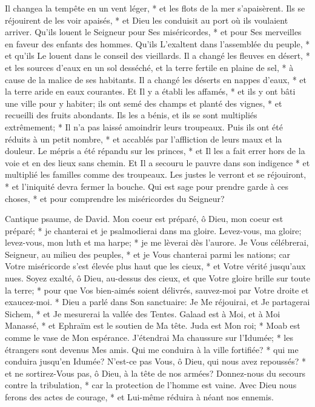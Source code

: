 Il changea la tempête en un vent léger, * et les flots de la mer s'apaisèrent.
Ils se réjouirent de les voir apaisés, * et Dieu les conduisit au port où ils voulaient arriver.
Qu'ils louent le Seigneur pour Ses miséricordes, * et pour Ses merveilles en faveur des enfants des hommes.
Qu'ils L'exaltent dans l'assemblée du peuple, * et qu'ils Le louent dans le conseil des vieillards.
Il a changé les fleuves en désert, * et les sources d'eaux en un sol desséché,
et la terre fertile en plaine de sel, * à cause de la malice de ses habitants.
Il a changé les déserts en nappes d'eaux, * et la terre aride en eaux courantes.
Et Il y a établi les affamés, * et ils y ont bâti une ville pour y habiter;
ils ont semé des champs et planté des vignes, * et recueilli des fruits abondants.
Ils les a bénis, et ils se sont multipliés extrêmement; * Il n'a pas laissé amoindrir leurs troupeaux.
Puis ils ont été réduits à un petit nombre, * et accablés par l'affliction de leurs maux et la douleur.
Le mépris a été répandu sur les princes, * et Il les a fait errer hors de la voie et en des lieux sans chemin.
Et Il a secouru le pauvre dans son indigence * et multiplié les familles comme des troupeaux.
Les justes le verront et se réjouiront, * et l'iniquité devra fermer la bouche.
Qui est sage pour prendre garde à ces choses, * et pour comprendre les miséricordes du Seigneur?

Cantique psaume, de David.
Mon coeur est préparé, ô Dieu, mon coeur est préparé; * je chanterai et je psalmodierai dans ma gloire.
Levez-vous, ma gloire; levez-vous, mon luth et ma harpe; * je me lèverai dès l'aurore.
Je Vous célébrerai, Seigneur, au milieu des peuples, * et je Vous chanterai parmi les nations;
car Votre miséricorde s'est élevée plus haut que les cieux, * et Votre vérité jusqu'aux nues.
Soyez exalté, ô Dieu, au-dessus des cieux, et que Votre gloire brille sur toute la terre; *
pour que Vos bien-aimés soient délivrés, sauvez-moi par Votre droite et exaucez-moi. *
Dieu a parlé dans Son sanctuaire: Je Me réjouirai, et Je partagerai Sichem, * et Je mesurerai la vallée des Tentes.
Galaad est à Moi, et à Moi Manassé, * et Ephraïm est le soutien de Ma tête. Juda est Mon roi; *
Moab est comme le vase de Mon espérance. J'étendrai Ma chaussure sur l'Idumée; * les étrangers sont devenus Mes amis.
Qui me conduira à la ville fortifiée? * qui me conduira jusqu'en Idumée?
N'est-ce pas Vous, ô Dieu, qui nous avez repoussés? * et ne sortirez-Vous pas, ô Dieu, à la tête de nos armées?
Donnez-nous du secours contre la tribulation, * car la protection de l'homme est vaine.
Avec Dieu nous ferons des actes de courage, * et Lui-même réduira à néant nos ennemis.

